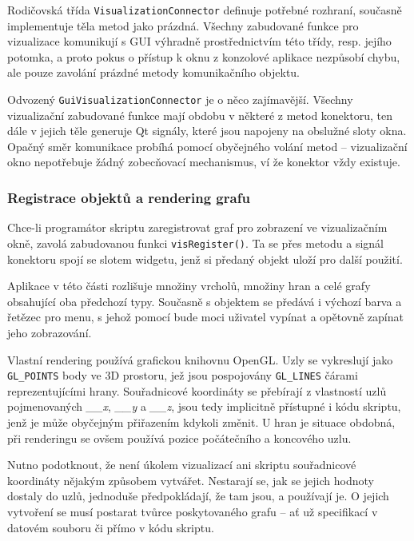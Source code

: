 \documentclass[11pt,twoside,a4paper]{book}
\begin{document}
Rodičovská třída \texttt{VisualizationConnector} definuje potřebné rozhraní, současně implementuje těla metod jako prázdná. Všechny zabudované funkce pro vizualizace komunikují s GUI výhradně prostřednictvím této třídy, resp. jejího potomka, a proto pokus o přístup k oknu z konzolové aplikace nezpůsobí chybu, ale pouze zavolání prázdné metody komunikačního objektu.

Odvozený \texttt{GuiVisualizationConnector} je o něco zajímavější. Všechny vizualizační zabudované funkce mají obdobu v některé z metod konektoru, ten dále v jejich těle generuje Qt signály, které jsou napojeny na obslužné sloty okna. Opačný směr komunikace probíhá pomocí obyčejného volání metod -- vizualizační okno nepotřebuje žádný zobecňovací mechanismus, ví že konektor vždy existuje.


\subsubsection{Registrace objektů a rendering grafu}

Chce-li programátor skriptu zaregistrovat graf pro zobrazení ve vizualizačním okně, zavolá zabudovanou funkci \texttt{visRegister()}. Ta se přes metodu a signál konektoru spojí se slotem widgetu, jenž si předaný objekt uloží pro další použití.

Aplikace v této části rozlišuje množiny vrcholů, množiny hran a celé grafy obsahující oba předchozí typy. Současně s objektem se předává i výchozí barva a řetězec pro menu, s jehož pomocí bude moci uživatel vypínat a opětovně zapínat jeho zobrazování.

Vlastní rendering používá grafickou knihovnu OpenGL. Uzly se vykreslují jako \texttt{GL\_POINTS} body ve 3D prostoru, jež jsou pospojovány \texttt{GL\_LINES} čárami reprezentujícími hrany. Sou\-řad\-ni\-co\-vé koordináty se přebírají z vlastností uzlů pojmenovaných \textit{\_\_x}, \textit{\_\_y} a \textit{\_\_z}, jsou tedy implicitně přístupné i kódu skriptu, jenž je může obyčejným přiřazením kdykoli změnit. U hran je situace obdobná, při renderingu se ovšem používá pozice počátečního a koncového uzlu.

Nutno podotknout, že není úkolem vizualizací ani skriptu souřadnicové koordináty nějakým způsobem vytvářet. Nestarají se, jak se jejich hodnoty dostaly do uzlů, jednoduše před\-po\-klá\-da\-jí, že tam jsou, a používají je. O jejich vytvoření se musí postarat tvůrce poskytovaného grafu -- ať už specifikací v datovém souboru či přímo v kódu skriptu.
\end{document}
